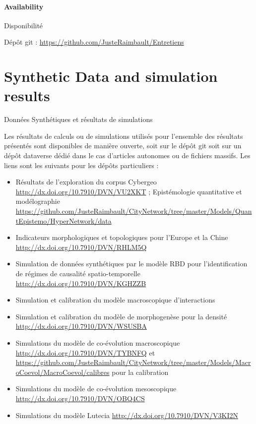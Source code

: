 % 

\paragraph{Availability}{Disponibilité}

Dépôt git : \url{https://github.com/JusteRaimbault/Entretiens}








\section{Synthetic Data and simulation results}{Données Synthétiques et résultats de simulations}

Les résultats de calculs ou de simulations utilisés pour l'ensemble des résultats présentés sont disponibles de manière ouverte, soit sur le dépôt git soit sur un dépôt dataverse dédié dans le cas d'articles autonomes ou de fichiers massifs. Les liens sont les suivants pour les dépôts particuliers :

\begin{itemize}
	\item Résultats de l'exploration du corpus Cybergeo \url{http://dx.doi.org/10.7910/DVN/VU2XKT} ; Epistémologie quantitative et modélographie \url{https://github.com/JusteRaimbault/CityNetwork/tree/master/Models/QuantEpistemo/HyperNetwork/data}
	\item Indicateurs morphologiques et topologiques pour l'Europe et la Chine \url{http://dx.doi.org/10.7910/DVN/RHLM5Q}
	\item Simulation de données synthétiques par le modèle RBD pour l'identification de régimes de causalité spatio-temporelle \url{http://dx.doi.org/10.7910/DVN/KGHZZB}
	\item Simulation et calibration du modèle macroscopique d'interactions \url{}
	\item Simulation et calibration du modèle de morphogenèse pour la densité \url{http://dx.doi.org/10.7910/DVN/WSUSBA}
	\item Simulations du modèle de co-évolution macroscopique \url{http://dx.doi.org/10.7910/DVN/TYBNFQ} et \url{https://github.com/JusteRaimbault/CityNetwork/tree/master/Models/MacroCoevol/MacroCoevol/calibres} pour la calibration
	\item Simulations du modèle de co-évolution mesoscopique \url{http://dx.doi.org/10.7910/DVN/OBQ4CS}
	\item Simulations du modèle Lutecia \url{http://dx.doi.org/10.7910/DVN/V3KI2N}
\end{itemize}













